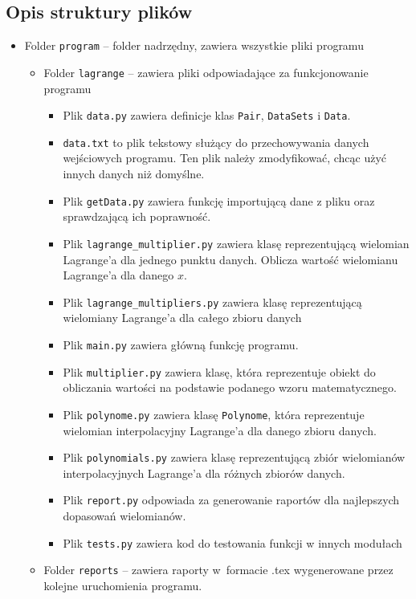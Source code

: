 \documentclass[12pt]{article}
\begin{document}
\subsection{Opis struktury plików}
\begin{itemize}
    \item Folder \verb|program| – folder nadrzędny, zawiera wszystkie pliki programu
    \begin{itemize}
        \item Folder \verb|lagrange| – zawiera pliki odpowiadające za funkcjonowanie programu
        \begin{itemize}
            \item Plik \verb|data.py| zawiera definicje klas \verb|Pair|, \verb|DataSets| i \verb|Data|.
            \item \verb|data.txt| to plik tekstowy służący do przechowywania danych wejściowych programu. Ten plik należy zmodyfikować, chcąc użyć innych danych niż domyślne.
            \item Plik \verb|getData.py| zawiera funkcję importującą dane z pliku oraz sprawdzającą ich poprawność.
            \item Plik \verb|lagrange_multiplier.py| zawiera klasę reprezentującą wielomian Lagrange'a dla jednego punktu danych. Oblicza wartość wielomianu Lagrange'a dla danego $x$.
            \item Plik \verb|lagrange_multipliers.py| zawiera klasę reprezentującą wielomiany Lagrange'a dla całego zbioru danych
            \item Plik \verb|main.py| zawiera główną funkcję programu.
            \item Plik \verb|multiplier.py| zawiera klasę, która reprezentuje obiekt do obliczania wartości na podstawie podanego wzoru matematycznego.
            \item Plik \verb|polynome.py| zawiera klasę \verb|Polynome|, która reprezentuje wielomian interpolacyjny Lagrange'a dla danego zbioru danych.
            \item Plik \verb|polynomials.py| zawiera klasę reprezentującą zbiór wielomianów interpolacyjnych Lagrange'a dla różnych zbiorów danych.
            \item Plik \verb|report.py| odpowiada za generowanie raportów dla najlepszych dopasowań wielomianów.
            \item Plik \verb|tests.py| zawiera kod do testowania funkcji w innych modułach
        \end{itemize}
        \item Folder \verb|reports| – zawiera raporty w~formacie .tex wygenerowane przez kolejne uruchomienia programu.
    \end{itemize}
\end{itemize}
\end{document}
